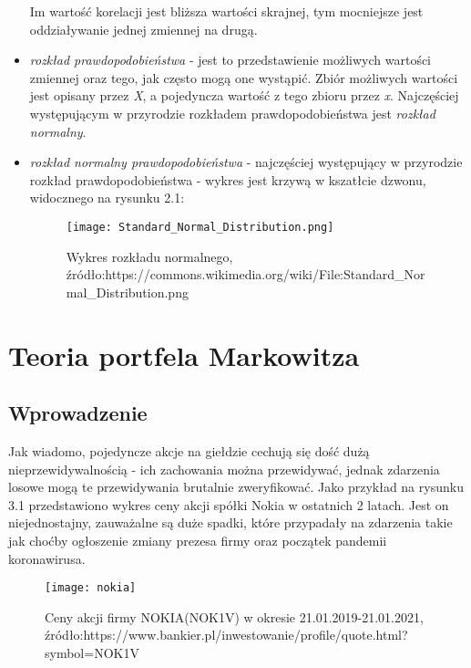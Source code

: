 \documentclass[magister]{dyplom}
\begin{document}
\begin{itemize}
Im wartość korelacji jest bliższa wartości skrajnej, tym mocniejsze jest oddziaływanie jednej zmiennej na drugą.\\

\item \textit{rozkład prawdopodobieństwa} - jest to przedstawienie możliwych wartości zmiennej oraz tego, jak często mogą one wystąpić. Zbiór możliwych wartości jest opisany przez \textit{X}, a pojedyncza wartość z tego zbioru przez \textit{x}. Najczęściej występującym w przyrodzie rozkładem prawdopodobieństwa jest \textit{rozkład normalny}.\newline
\newpage
\item \textit{rozkład normalny prawdopodobieństwa} - najczęściej występujący w przyrodzie rozkład prawdopodobieństwa - wykres jest krzywą w kszatłcie dzwonu, widocznego na rysunku 2.1:
\begin{figure}[h]
	\centering
	\texttt{[image: Standard\_Normal\_Distribution.png]}
	\caption{Wykres rozkładu normalnego,\newline
		źródło:https://commons.wikimedia.org/wiki/File:Standard\_Normal\_Distribution.png}
\end{figure}
\end{itemize}
\chapter{Teoria portfela Markowitza}

\section{Wprowadzenie}

Jak wiadomo, pojedyncze akcje na giełdzie cechują się dość dużą nieprzewidywalnością - ich zachowania można przewidywać, jednak zdarzenia losowe mogą te przewidywania brutalnie zweryfikować. Jako przykład na rysunku 3.1 przedstawiono wykres ceny akcji spółki Nokia w ostatnich 2 latach. Jest on niejednostajny, zauważalne są duże spadki, które przypadały na zdarzenia takie jak choćby ogłoszenie zmiany prezesa firmy oraz początek pandemii koronawirusa. 

\begin{figure}[h]
\texttt{[image: nokia]}
\caption{Ceny akcji firmy NOKIA(NOK1V) w okresie 21.01.2019-21.01.2021,\newline
	źródło:https://www.bankier.pl/inwestowanie/profile/quote.html?symbol=NOK1V}
\end{figure}
\end{document}

